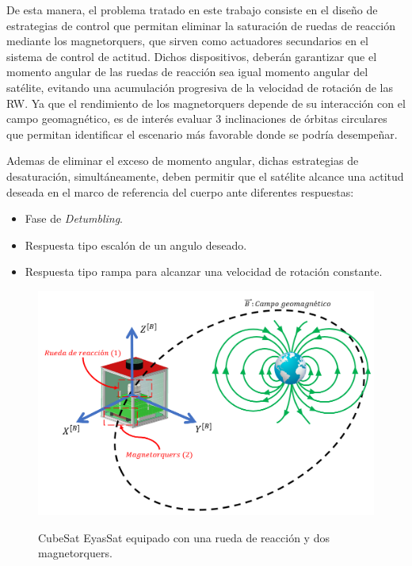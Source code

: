 De esta manera, el problema tratado en este trabajo consiste en el diseño de estrategias de control que permitan eliminar la saturación de ruedas de reacción mediante los magnetorquers, que sirven como actuadores secundarios en el sistema de control de actitud. Dichos dispositivos, deberán garantizar que el momento angular de las ruedas de reacción sea igual momento angular del satélite, evitando una acumulación progresiva de la velocidad de rotación de las RW.
Ya que el rendimiento de los magnetorquers depende de su interacción con el campo geomagnético, es de interés evaluar 3 inclinaciones de órbitas circulares que permitan identificar el escenario más favorable donde se podría desempeñar.

Ademas de eliminar el exceso de momento angular, dichas estrategias de desaturación, simultáneamente, deben permitir que el satélite alcance una actitud deseada en el marco de referencia del cuerpo ante diferentes respuestas:
\begin{itemize}
	\item Fase de \textit{Detumbling}. 
	\item Respuesta tipo escalón de un angulo deseado.
	\item Respuesta tipo rampa para alcanzar una velocidad de rotación constante.
\end{itemize} 
 

\begin{figure}[!ht]
	\begin{center}
		\includegraphics[scale=0.5]{imagenes/planteamiento_del_problema/esquema_planteamiento.PNG}\\
	\end{center}
	\caption{CubeSat EyasSat equipado con una rueda de reacción y dos magnetorquers.}
	\label{fig:diagrama_problema}
\end{figure}

